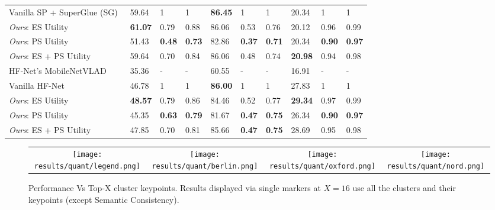 \documentclass[letterpaper, 10 pt, conference]{ieeeconf}  \fi
\begin{document}
\begin{table*}
{\begin{tabular}{llllllllll}
Vanilla SP + SuperGlue (SG)~\cite{sarlin2020superglue} & 59.64          & 1             & 1             & \textbf{86.45}          & 1             & 1             & 20.34          & 1             & 1             \\
\textit{Ours}: ES Utility         & \textbf{61.07} & 0.79          & 0.88          & 86.06 & 0.53          & 0.76          & 20.12 & 0.96          & 0.99          \\
\textit{Ours}: PS Utility        & 51.43          & \textbf{0.48} & \textbf{0.73} & 82.86          & \textbf{0.37} & \textbf{0.71} & 20.34          & \textbf{0.90}          & \textbf{0.97}          \\
\textit{Ours}: ES + PS Utility    & 59.64          & 0.70          & 0.84          & 86.06 & 0.48          & 0.74          & \textbf{20.98} & 0.94         & 0.98          \\

\midrule

HF-Net's MobileNetVLAD~\cite{sarlin2019coarse}                 & 35.36          & -             & -             & 60.55          & -             & -             & 16.91           & -             & -             \\
Vanilla HF-Net  & 46.78          & 1             & 1             & \textbf{86.00}          & 1             & 1             & 27.83          & 1             & 1             \\
\textit{Ours}: ES Utility         & \textbf{48.57} & 0.79          & 0.86          & 84.46 & 0.52          & 0.77          & \textbf{29.34} & 0.97          & 0.99          \\
\textit{Ours}: PS Utility        & 45.35          & \textbf{0.63} & \textbf{0.79} & 81.67          & \textbf{0.47} & \textbf{0.75} & 26.34          & \textbf{0.90}          & \textbf{0.97}          \\
\textit{Ours}: ES + PS Utility    & 47.85          & 0.70          & 0.81          & 85.66 & \textbf{0.47}          & \textbf{0.75}          & 28.69 & 0.95          & 0.98          \\

\bottomrule
\end{tabular}
}
\label{tab:mainResult}
\end{table*}


\begin{figure*}
\centering
\begin{tabular}{cccc}
\texttt{[image: results/quant/legend.png]}
&
\texttt{[image: results/quant/berlin.png]}
& 
\texttt{[image: results/quant/oxford.png]}
&
\texttt{[image: results/quant/nord.png]} \\
\end{tabular}
\caption{Performance Vs Top-X cluster keypoints. Results displayed via single markers at $X=16$ use all the clusters and their keypoints (except Semantic Consistency).}
\label{fig:mainResult}
\end{figure*}
\end{document}
